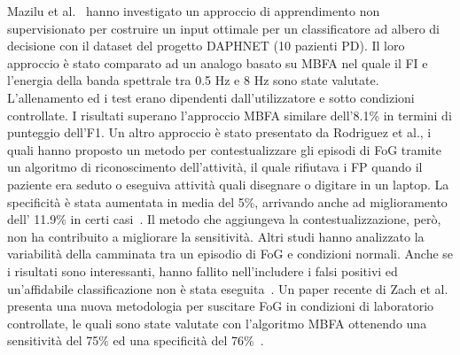 Mazilu et al.~\cite{50} hanno investigato un approccio di apprendimento non supervisionato per costruire un input ottimale per un classificatore ad albero di decisione con il dataset del progetto DAPHNET (10 pazienti PD). Il loro approccio è stato comparato ad un analogo basato su MBFA nel quale il FI e l'energia della banda spettrale tra 0.5 Hz e 8 Hz sono state valutate. L'allenamento ed i test erano dipendenti dall'utilizzatore e sotto condizioni controllate. I risultati superano l'approccio MBFA similare dell'8.1\% in termini di punteggio dell'F1. Un altro approccio è stato presentato da Rodriguez et al., i quali hanno proposto un metodo per contestualizzare gli episodi di FoG tramite un algoritmo di riconoscimento dell'attività, il quale rifiutava i FP quando il paziente era seduto o eseguiva attività quali disegnare o digitare in un laptop. La specificità è stata aumentata in media del 5\%, arrivando anche ad miglioramento dell' 11.9\% in certi casi~\cite{50}. Il metodo che aggiungeva la contestualizzazione, però, non ha contribuito a migliorare la sensitività. Altri studi hanno analizzato la variabilità della camminata tra un episodio di FoG e condizioni normali. Anche se i risultati sono interessanti, hanno fallito nell'includere i falsi positivi ed un'affidabile classificazione non è stata eseguita~\cite{53,54}. Un paper recente di Zach et al. presenta una nuova metodologia per suscitare FoG in condizioni di laboratorio controllate, le quali sono state valutate con l'algoritmo MBFA ottenendo una sensitività del 75\% ed una specificità del 76\%~\cite{31}. \newline

